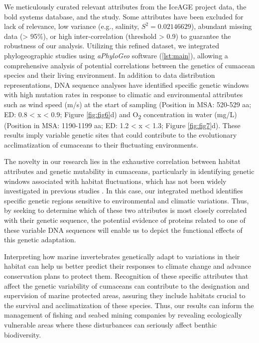 We meticulously curated relevant attributes from the IceAGE project data, the bold systems database, and the \citep{uhlir_adding_2021} study. Some attributes have been excluded for lack of relevance, low variance (e.g., salinity, $S^2 = 0.02146629$), abundant missing data (> 95\%), or high inter-correlation (threshold > 0.9) to guarantee the robustness of our analysis. Utilizing this refined dataset, we integrated phylogeographic studies using \textit{aPhyloGeo} software (\autoref{lst:main}), allowing a comprehensive analysis of potential correlations between the genetics of cumacean species and their living environment. In addition to data distribution representations, DNA sequence analyses have identified specific genetic windows with high mutation rates in response to climatic and environmental attributes such as wind speed (m/s) at the start of sampling (Position in MSA: 520-529 aa; ED: 0.8 < x < 0.9; Figure \ref{fig:fig6}d) and O\textsubscript{2} concentration in water (mg/L) (Position in MSA: 1190-1199 aa; ED: 1.2 < x < 1.3; Figure \ref{fig:fig7}d). These results imply variable genetic sites that could contribute to the evolutionary acclimatization of cumaceans to their fluctuating environments.

The novelty in our research lies in the exhaustive correlation between habitat attributes and genetic mutability in cumaceans, particularly in identifying genetic windows associated with habitat fluctuations, which has not been widely investigated in previous studies \citep{manel2003landscape, vrijenhoek2009cryptic}. In this case, our integrated method identifies specific genetic regions sensitive to environmental and climatic variations. Thus, by seeking to determine which of these two attributes is most closely correlated with their genetic sequence, the potential evidence of proteins related to one of these variable DNA sequences will enable us to depict the functional effects of this genetic adaptation.

Interpreting how marine invertebrates genetically adapt to variations in their habitat can help us better predict their responses to climate change and advance conservation plans to protect them. Recognition of these specific attributes that affect the genetic variability of cumaceans can contribute to the designation and supervision of marine protected areas, assuring they include habitats crucial to the survival and acclimatization of these species. Thus, our results can inform the management of fishing and seabed mining companies by revealing ecologically vulnerable areas where these disturbances can seriously affect benthic biodiversity.

